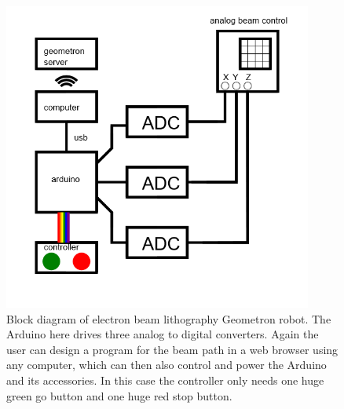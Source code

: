 \begin{figure}
	\centering
	\includegraphics[width=4in]{figures/machines/eblblockdiagram.png}
	\caption[eblblockdiagram]
	{Block diagram of electron beam lithography Geometron robot.  The Arduino here drives three analog to digital converters.  Again the user can design a program for the beam path in a web browser using any computer, which can then also control and power the Arduino and its accessories.  In this case the controller only needs one huge green go button and one huge red stop button.}
\end{figure}




